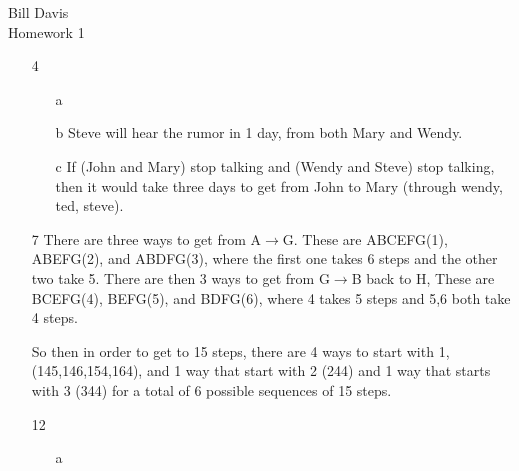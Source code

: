 \documentclass{article}
\begin{document}
Bill Davis\\
Homework 1

\begin{enumerate}
  \item[4]
  	\begin{enumerate}
    	\item[a]

    	
    	\item[b]
    	Steve will hear the rumor in 1 day, from both Mary and Wendy. 
    	\item[c]
    	If (John and Mary) stop talking and (Wendy and Steve) stop talking, then
    	it would take three days to get from John to Mary (through wendy, ted,
    	steve).
      \end{enumerate} 
      
      \item[7] 
      There are three ways to get from A$\rightarrow$G. These are ABCEFG(1),
      ABEFG(2), and ABDFG(3), where the first one takes 6 steps and the other two take 5.
      There are then 3 ways to get from G$\rightarrow$B back to H, These are
      BCEFG(4), BEFG(5), and BDFG(6), where 4 takes 5 steps and 5,6 both take 4
      steps.
      
      So then in order to get to 15 steps, there are 4 ways to start with 1,
      (145,146,154,164), and 1 way that start with 2 (244) and 1 way that
      starts with 3 (344) for a total of 6 possible sequences of 15 steps.
      
      \item[12]
      \begin{enumerate}
      	\item[a]


\end{enumerate}
\end{enumerate}
\end{document}

